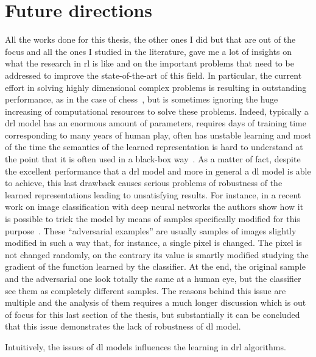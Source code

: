 \section{Future directions}
All the works done for this thesis, the other ones I did but that are out of the focus and all the ones I studied in the literature, gave me a lot of insights on what the research in \gls{rl} is like and on the important problems that need to be addressed to improve the state-of-the-art of this field. In particular, the current effort in solving highly dimensional complex problems is resulting in outstanding performance, as in the case of chess~\cite{silver2017chess}, but is sometimes ignoring the huge increasing of computational resources to solve these problems. Indeed, typically a \gls{drl} model has an enormous amount of parameters, requires days of training time corresponding to many years of human play, often has unstable learning and most of the time the semantics of the learned representation is hard to understand at the point that it is often used in a black-box way~\cite{mnih2015human}. As a matter of fact, despite the excellent performance that a \gls{drl} model and more in general a \gls{dl} model is able to achieve, this last drawback causes serious problems of robustness of the learned representations leading to unsatisfying results. For instance, in a recent work on image classification with deep neural networks the authors show how it is possible to trick the model by means of samples specifically modified for this purpose~\cite{yuan2017adversarial}. These ``adversarial examples'' are usually samples of images slightly modified in such a way that, for instance, a single pixel is changed. The pixel is not changed randomly, on the contrary its value is smartly modified studying the gradient of the function learned by the classifier. At the end, the original sample and the adversarial one look totally the same at a human eye, but the classifier see them as completely different samples. The reasons behind this issue are multiple and the analysis of them requires a much longer discussion which is out of focus for this last section of the thesis, but substantially it can be concluded that this issue demonstrates the lack of robustness of \gls{dl} model.

Intuitively, the issues of \gls{dl} models influences the learning in \gls{drl} algorithms.
